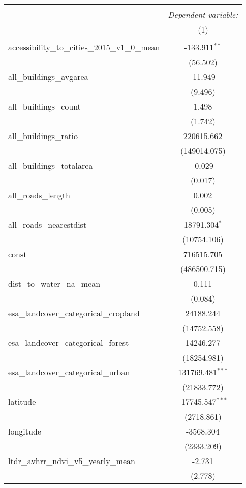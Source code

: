 \begin{table}[!htbp] \centering
\begin{tabular}{@{\extracolsep{5pt}}lc}
\\[-1.8ex]\hline
\hline \\[-1.8ex]
& \multicolumn{1}{c}{\textit{Dependent variable:}} \
\cr \cline{1-2}
\\[-1.8ex] & (1) \\
\hline \\[-1.8ex]
 accessibility_to_cities_2015_v1_0_mean & -133.911$^{**}$ \\
  & (56.502) \\
 all_buildings_avgarea & -11.949$^{}$ \\
  & (9.496) \\
 all_buildings_count & 1.498$^{}$ \\
  & (1.742) \\
 all_buildings_ratio & 220615.662$^{}$ \\
  & (149014.075) \\
 all_buildings_totalarea & -0.029$^{}$ \\
  & (0.017) \\
 all_roads_length & 0.002$^{}$ \\
  & (0.005) \\
 all_roads_nearestdist & 18791.304$^{*}$ \\
  & (10754.106) \\
 const & 716515.705$^{}$ \\
  & (486500.715) \\
 dist_to_water_na_mean & 0.111$^{}$ \\
  & (0.084) \\
 esa_landcover_categorical_cropland & 24188.244$^{}$ \\
  & (14752.558) \\
 esa_landcover_categorical_forest & 14246.277$^{}$ \\
  & (18254.981) \\
 esa_landcover_categorical_urban & 131769.481$^{***}$ \\
  & (21833.772) \\
 latitude & -17745.547$^{***}$ \\
  & (2718.861) \\
 longitude & -3568.304$^{}$ \\
  & (2333.209) \\
 ltdr_avhrr_ndvi_v5_yearly_mean & -2.731$^{}$ \\
  & (2.778) \\

\end{tabular}
\end{table}
